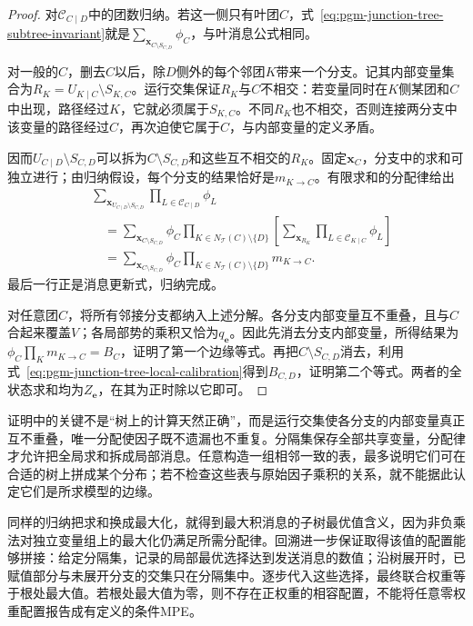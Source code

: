 \begin{proof}
  对$\mathcal{C}_{C\mid D}$中的团数归纳。若这一侧只有叶团$C$，式~\eqref{eq:pgm-junction-tree-subtree-invariant}就是$\sum_{\bm{x}_{C\setminus S_{C,D}}}\phi_C$，与叶消息公式相同。

  对一般的$C$，删去$C$以后，除$D$侧外的每个邻团$K$带来一个分支。记其内部变量集合为$R_K=U_{K\mid C}\setminus S_{K,C}$。运行交集保证$R_K$与$C$不相交：若变量同时在$K$侧某团和$C$中出现，路径经过$K$，它就必须属于$S_{K,C}$。不同$R_K$也不相交，否则连接两分支中该变量的路径经过$C$，再次迫使它属于$C$，与内部变量的定义矛盾。

  因而$U_{C\mid D}\setminus S_{C,D}$可以拆为$C\setminus S_{C,D}$和这些互不相交的$R_K$。固定$\bm{x}_C$，分支中的求和可独立进行；由归纳假设，每个分支的结果恰好是$m_{K\to C}$。有限求和的分配律给出
  \[
    \begin{aligned}
      &\sum_{\bm{x}_{U_{C\mid D}\setminus S_{C,D}}}
         \prod_{L\in\mathcal{C}_{C\mid D}}\phi_L\\
      &\quad=\sum_{\bm{x}_{C\setminus S_{C,D}}}\phi_C
         \prod_{K\in N_{\mathcal{T}}(C)\setminus\{D\}}
          \left[
            \sum_{\bm{x}_{R_K}}
              \prod_{L\in\mathcal{C}_{K\mid C}}\phi_L
          \right]\\
      &\quad=\sum_{\bm{x}_{C\setminus S_{C,D}}}\phi_C
         \prod_{K\in N_{\mathcal{T}}(C)\setminus\{D\}}m_{K\to C}.
    \end{aligned}
  \]
  最后一行正是消息更新式，归纳完成。

  对任意团$C$，将所有邻接分支都纳入上述分解。各分支内部变量互不重叠，且与$C$合起来覆盖$V$；各局部势的乘积又恰为$q_{\bm{e}}$。因此先消去分支内部变量，所得结果为$\phi_C\prod_K m_{K\to C}=B_C$，证明了第一个边缘等式。再把$C\setminus S_{C,D}$消去，利用式~\eqref{eq:pgm-junction-tree-local-calibration}得到$B_{C,D}$，证明第二个等式。两者的全状态求和均为$Z_{\bm{e}}$，在其为正时除以它即可。
\end{proof}

证明中的关键不是“树上的计算天然正确”，而是运行交集使各分支的内部变量真正互不重叠，唯一分配使因子既不遗漏也不重复。分隔集保存全部共享变量，分配律才允许把全局求和拆成局部消息。任意构造一组相邻一致的表，最多说明它们可在合适的树上拼成某个分布；若不检查这些表与原始因子乘积的关系，就不能据此认定它们是所求模型的边缘。

同样的归纳把求和换成最大化，就得到最大积消息的子树最优值含义，因为非负乘法对独立变量组上的最大化仍满足所需分配律。回溯进一步保证取得该值的配置能够拼接：给定分隔集，记录的局部最优选择达到发送消息的数值；沿树展开时，已赋值部分与未展开分支的交集只在分隔集中。逐步代入这些选择，最终联合权重等于根处最大值。若根处最大值为零，则不存在正权重的相容配置，不能将任意零权重配置报告成有定义的条件MPE。

